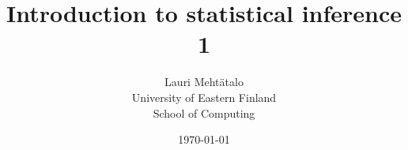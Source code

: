 \documentclass[10pt, twoside, a4paper]{book}
\theoremstyle{definition}
\begin{document}
\setlength{\baselineskip}{16pt}

\title{Introduction to statistical inference 1}

\author{Lauri Meht\"atalo\\
	   University of Eastern Finland \\ School of Computing
	   }

\date{\normalsize \today}
\maketitle
\tableofcontents



\mainmatter
{}
\end{document}
